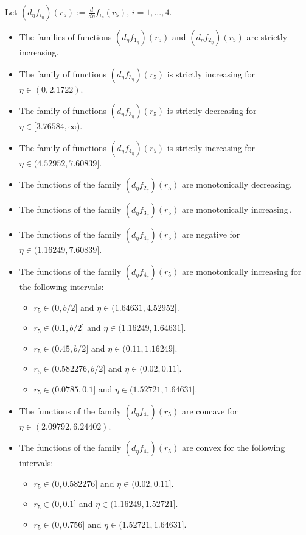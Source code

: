 \documentclass[10pt,a4paper]{amsart}
\begin{document}
\begin{properties}\label{dfs}
Let $\left(d_{\eta}f_{i_\eta}\right)(r_5):=\frac{d}{d\eta}f_{i_\eta}(r_5)$, $i=1,...,4$.
\begin{itemize}
\item The families of functions $\left(d_{\eta}f_{1_\eta}\right)(r_5)$ and $\left(d_{\eta}f_{2_\eta}\right)(r_5)$ are strictly increasing.
\item The family of functions $\left(d_{\eta}f_{3_\eta}\right)(r_5)$ is strictly increasing for $\eta\in(0,2.1722)$.
\item The family of functions $\left(d_{\eta}f_{3_\eta}\right)(r_5)$ is strictly decreasing for $\eta\in[3.76584,\infty)$.
\item The family of functions $\left(d_{\eta}f_{4_\eta}\right)(r_5)$ is strictly increasing for $\eta\in(4.52952,7.60839]$.
\item The functions of the family $\left(d_{\eta}f_{2_\eta}\right)(r_5)$ are monotonically decreasing.
\item The functions of the family $\left(d_{\eta}f_{3_\eta}\right)(r_5)$ are monotonically increasing\,. 
\item The functions of the family $\left(d_{\eta}f_{4_\eta}\right)(r_5)$ are negative for $\eta\in(1.16249,7.60839]$.
\item The functions of the family $\left(d_{\eta}f_{4_\eta}\right)(r_5)$ are monotonically increasing for the following intervals: 
\begin{itemize}
\item $r_{5}\in(0,b/2]$ and $\eta\in(1.64631,4.52952]$.
\item $r_{5}\in(0.1,b/2]$ and $\eta\in(1.16249,1.64631]$.
\item $r_{5}\in(0.45,b/2]$ and $\eta\in(0.11,1.16249]$.
\item $r_{5}\in(0.582276,b/2]$ and $\eta\in(0.02,0.11]$.
\item $r_{5}\in(0.0785,0.1]$ and $\eta\in(1.52721,1.64631]$.
\end{itemize}
\item The functions of the family $\left(d_{\eta}f_{4_\eta}\right)(r_5)$ are concave for $\eta\in(2.09792,6.24402)$.
\item The functions of the family $\left(d_{\eta}f_{4_\eta}\right)(r_5)$ are convex for the following intervals: 
\begin{itemize}
\item $r_{5}\in(0,0.582276]$ and $\eta\in(0.02,0.11]$.
\item $r_{5}\in(0,0.1]$ and $\eta\in(1.16249,1.52721]$.
\item $r_{5}\in(0,0.756]$ and $\eta\in(1.52721,1.64631]$.
\end{itemize}
\end{itemize}
\end{properties}
\end{document}
